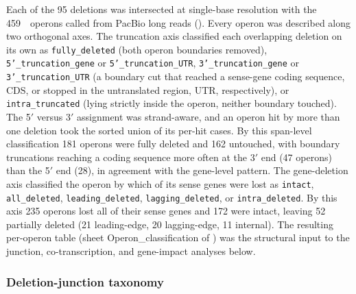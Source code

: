 Each of the 95 deletions was intersected at single-base resolution with the 459~\syn~operons called from PacBio long reads (\sdoperon).
Every operon was described along two orthogonal axes.
The truncation axis classified each overlapping deletion on its own as \texttt{fully\_deleted} (both operon boundaries removed), \texttt{5'\_truncation\_gene} or \texttt{5'\_truncation\_UTR}, \texttt{3'\_truncation\_gene} or \texttt{3'\_truncation\_UTR} (a boundary cut that reached a sense-gene coding sequence, CDS, or stopped in the untranslated region, UTR, respectively), or \texttt{intra\_truncated} (lying strictly inside the operon, neither boundary touched).
The 5$'$ versus 3$'$ assignment was strand-aware, and an operon hit by more than one deletion took the sorted union of its per-hit cases.
By this span-level classification 181 operons were fully deleted and 162 untouched, with boundary truncations reaching a coding sequence more often at the 3$'$ end (47 operons) than the 5$'$ end (28), in agreement with the gene-level pattern.
The gene-deletion axis classified the operon by which of its sense genes were lost as \texttt{intact}, \texttt{all\_deleted}, \texttt{leading\_deleted}, \texttt{lagging\_deleted}, or \texttt{intra\_deleted}.
By this axis 235 operons lost all of their sense genes and 172 were intact, leaving 52 partially deleted (21 leading-edge, 20 lagging-edge, 11 internal).
The resulting per-operon table (sheet Operon\_classification of \sdreduction) was the structural input to the junction, co-transcription, and gene-impact analyses below.

\subsubsection{Deletion-junction taxonomy}

